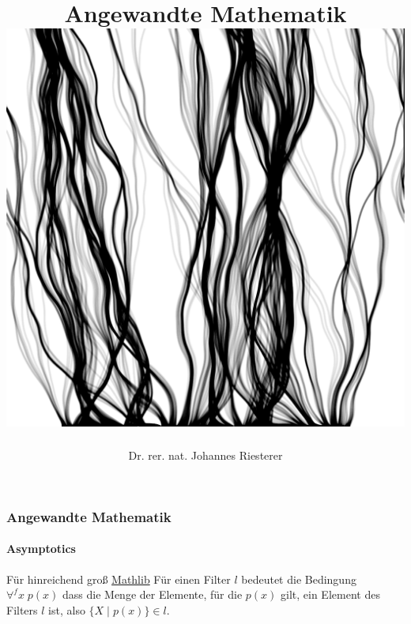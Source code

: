 \documentclass{beamer}
\begin{document}
\title[Angewandte Mathematik] %
{Angewandte Mathematik
\\
\includegraphics[scale=0.15]{images/cover}
}
\subtitle{}
\author[Dr. Johannes Riesterer] %
{Dr.  rer. nat. Johannes Riesterer}

\date[KPT 2004] %
{}

\subject{Angewandte Mathematik}

\frame{\titlepage}

\begin{frame}
    \frametitle{Angewandte Mathematik}
    \framesubtitle{Asymptotics}
    \begin{block}{Für hinreichend groß \href{https://github.com/leanprover-community/mathlib4/blob/418a5eb7aec3fb639097cb13f74fc031ac4057f2/Mathlib/Order/Filter/Defs.lean\#L243-L244}{Mathlib}}
        Für einen Filter $l$ bedeutet die Bedingung 
        \( \forall^f x \;  p(x) \) 
       dass die Menge der Elemente, für die \( p(x) \) gilt, ein Element des Filters \( l \) ist, also
        \( \{ X \; | \;  p(x) \} \in l \).
    \end{block}
\end{frame}
\end{document}
